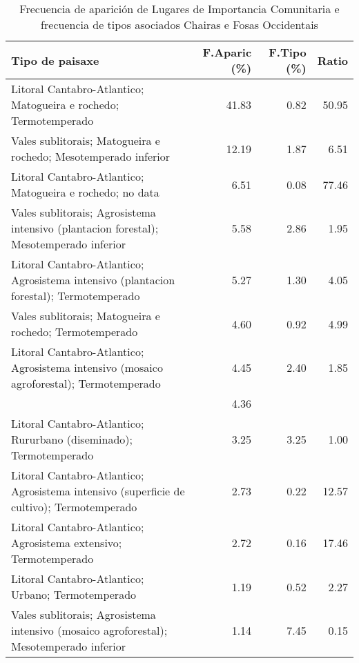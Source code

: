 \begin{table}[p]
\centering
\caption{Frecuencia de aparición de Lugares de Importancia Comunitaria e frecuencia de tipos asociados Chairas e Fosas Occidentais} 
\label{vnatura11}
\begin{tabular}{lrrr}
  \hline
Tipo de paisaxe & F.Aparic (\%) & F.Tipo (\%) & Ratio \\ 
  \hline
Litoral Cantabro-Atlantico; Matogueira e rochedo; Termotemperado & 41.83 & 0.82 & 50.95 \\ 
  Vales sublitorais; Matogueira e rochedo; Mesotemperado inferior & 12.19 & 1.87 & 6.51 \\ 
  Litoral Cantabro-Atlantico; Matogueira e rochedo; no data & 6.51 & 0.08 & 77.46 \\ 
  Vales sublitorais; Agrosistema intensivo (plantacion forestal); Mesotemperado inferior & 5.58 & 2.86 & 1.95 \\ 
  Litoral Cantabro-Atlantico; Agrosistema intensivo (plantacion forestal); Termotemperado & 5.27 & 1.30 & 4.05 \\ 
  Vales sublitorais; Matogueira e rochedo; Termotemperado & 4.60 & 0.92 & 4.99 \\ 
  Litoral Cantabro-Atlantico; Agrosistema intensivo (mosaico agroforestal); Termotemperado & 4.45 & 2.40 & 1.85 \\ 
   & 4.36 &  &  \\ 
  Litoral Cantabro-Atlantico; Rururbano (diseminado); Termotemperado & 3.25 & 3.25 & 1.00 \\ 
  Litoral Cantabro-Atlantico; Agrosistema intensivo (superficie de cultivo); Termotemperado & 2.73 & 0.22 & 12.57 \\ 
  Litoral Cantabro-Atlantico; Agrosistema extensivo; Termotemperado & 2.72 & 0.16 & 17.46 \\ 
  Litoral Cantabro-Atlantico; Urbano; Termotemperado & 1.19 & 0.52 & 2.27 \\ 
  Vales sublitorais; Agrosistema intensivo (mosaico agroforestal); Mesotemperado inferior & 1.14 & 7.45 & 0.15 \\ 
   \hline
\end{tabular}
\end{table}
